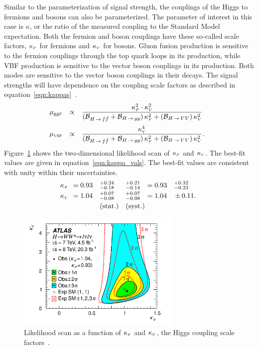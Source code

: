 Similar to the parameterization of signal strength, the couplings of the Higgs to fermions and bosons can also be parameterized. The parameter of interest in this case is $\kappa$, or the ratio of the measured coupling to the Standard Model expectation. Both the fermion and boson couplings have these so-called scale factors, $\kappa_{\mbox{\tiny $F$}}$ for fermions and $\kappa_{\mbox{\tiny $V$}}$ for bosons. Gluon fusion production is sensitive to the fermion couplings through the top quark loops in its production, while VBF production is sensitive to the vector boson couplings in its production. Both modes are sensitive to the vector boson couplings in their decays. The signal strengths will have dependence on the coupling scale factors as described in equation~\ref{eqn:kappas}~\cite{LHCXSWG}. 
%
\begin{equation}
\np%
\begin{array}{lc l}
  \mu_{\scggF} &\propto &{\displaystyle\frac{\kF^2 \cdot \kV^2}{(\BF_{\Hff}+\BF_{\Hgg})\,\kF^2+(\BF_{\HVV})\,\kV^2}}\\ \clineskip\clineskip
  \mu_{\scVBF} &\propto &{\displaystyle\frac{\kV^4            }{(\BF_{\Hff}+\BF_{\Hgg})\,\kF^2+(\BF_{\HVV})\,\kV^2}} . 
\end{array}
\label{eqn:kappas}
\end{equation}
%
Figure~\ref{fig:kappas} shows the two-dimensional likelihood scan of $\kappa_{\mbox{\tiny $F$}}$ and $\kappa_{\mbox{\tiny $V$}}$. The best-fit values are given in equation~\ref{eqn:kappa_vals}. The best-fit values are consistent with unity within their uncertainties. 
%
\begin{equation}
\begin{array}{llllll}
\no\kF\no&=0.93\no&\,\,^{+0.24}_{-0.18}\np&^{+0.21}_{-0.14}\np&=0.93&^{+0.32}_{-0.23} \\ \clineskip
\no\kV\no&=1.04\no&\,\,^{+0.07}_{-0.08}\np&^{+0.07}_{-0.08}\np&=1.04&{\PM}0.11.\\ \clineskip
                     &        & ~\textrm{(stat.)}     &\textrm{(syst.)}\np
\end{array}
\label{eqn:kappa_vals}
\end{equation}
%
\begin{figure}[h!]
  \centering
  \captionsetup{justification=centering}

  \includegraphics[width=0.7\textwidth]{figures/kappas}
  \caption{Likelihood scan as a function of $\kappa_{\mbox{\tiny $F$}}$ and $\kappa_{\mbox{\tiny $V$}}$, the Higgs coupling scale factors~\cite{WW2015}.}
  \label{fig:kappas}
\end{figure}

